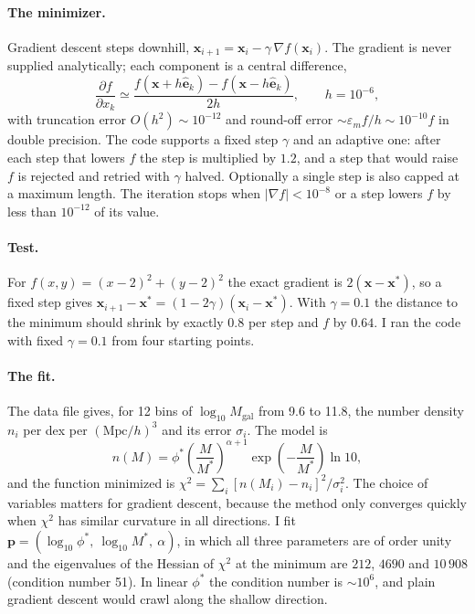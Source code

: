 \documentclass[11pt]{article}
\newcommand{\eps}{\varepsilon}
\begin{document}
\paragraph{The minimizer.}
Gradient descent steps downhill, $\mathbf{x}_{i+1} = \mathbf{x}_i -
\gamma\,\nabla f(\mathbf{x}_i)$. The gradient is never supplied analytically; each
component is a central difference,
\[
\frac{\partial f}{\partial x_k} \simeq
\frac{f(\mathbf{x}+h\hat{\mathbf{e}}_k) - f(\mathbf{x}-h\hat{\mathbf{e}}_k)}{2h},
\qquad h = 10^{-6},
\]
with truncation error $O(h^2)\sim10^{-12}$ and round-off error
$\sim\eps_m f/h \sim 10^{-10}f$ in double precision. The code supports a fixed
step $\gamma$ and an adaptive one: after each step that lowers $f$ the step is
multiplied by $1.2$, and a step that would raise $f$ is rejected and retried
with $\gamma$ halved. Optionally a single step is also capped at a maximum length.
The iteration stops when $|\nabla f|<10^{-8}$ or a step lowers $f$ by less
than $10^{-12}$ of its value.

\paragraph{Test.}
For $f(x,y) = (x-2)^2+(y-2)^2$ the exact gradient is $2(\mathbf{x}-\mathbf{x}^*)$,
so a fixed step gives $\mathbf{x}_{i+1}-\mathbf{x}^* = (1-2\gamma)(\mathbf{x}_i -
\mathbf{x}^*)$. With $\gamma=0.1$ the distance to the minimum should shrink by
exactly $0.8$ per step and $f$ by $0.64$. I ran the code with fixed $\gamma=0.1$
from four starting points.

\paragraph{The fit.}
The data file gives, for 12 bins of $\log_{10}M_{\mathrm{gal}}$ from 9.6 to 11.8,
the number density $n_i$ per dex per $(\mathrm{Mpc}/h)^3$ and its error
$\sigma_i$. The model is
\[
n(M) = \phi^*\left(\frac{M}{M^*}\right)^{\alpha+1}
\exp\!\left(-\frac{M}{M^*}\right)\ln 10 ,
\]
and the function minimized is
$\chi^2 = \sum_i [n(M_i)-n_i]^2/\sigma_i^2$. The choice of variables matters for
gradient descent, because the method only converges quickly when $\chi^2$ has
similar curvature in all directions. I fit
$\mathbf{p} = (\log_{10}\phi^*,\ \log_{10}M^*,\ \alpha)$, in which all three
parameters are of order unity and the eigenvalues of the Hessian of $\chi^2$ at
the minimum are $212$, $4690$ and $10\,908$ (condition number 51). In linear
$\phi^*$ the condition number is $\sim10^{6}$, and plain gradient descent would
crawl along the shallow direction.
\end{document}
